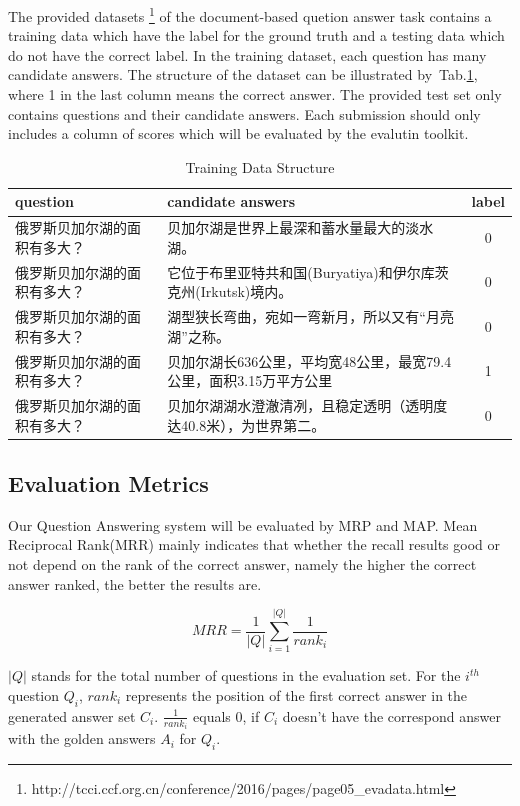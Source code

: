 \documentclass{llncs}
\begin{document}
The provided datasets \footnote{ http://tcci.ccf.org.cn/conference/2016/pages/page05\_evadata.html} of the document-based quetion answer task contains a training data which have the label for the ground truth and a testing data which do not have the correct label.  In the training dataset, each question has many candidate answers. The structure of the dataset can be illustrated by~Tab.\ref{tab:table1}, where 1 in the last column means the correct answer. The provided test set  only contains questions and their candidate answers. Each submission should only includes a column of scores which will be evaluated by the evalutin toolkit.  


\begin{table}[!hbp]
\caption{Training Data Structure}
\scriptsize
\label{tab:table1}
\begin{tabular}{|l|l|c|}
 \hline
question & candidate answers & label \\ \hline
俄罗斯贝加尔湖的面积有多大？& 贝加尔湖是世界上最深和蓄水量最大的淡水湖。& 0 \\
\hline
俄罗斯贝加尔湖的面积有多大？& 它位于布里亚特共和国(Buryatiya)和伊尔库茨克州(Irkutsk)境内。&0\\
\hline
俄罗斯贝加尔湖的面积有多大？& 湖型狭长弯曲，宛如一弯新月，所以又有“月亮湖”之称。&0\\
\hline
俄罗斯贝加尔湖的面积有多大？& 贝加尔湖长636公里，平均宽48公里，最宽79.4公里，面积3.15万平方公里& 1\\
\hline
俄罗斯贝加尔湖的面积有多大？& 贝加尔湖湖水澄澈清冽，且稳定透明（透明度达40.8米），为世界第二。&0\\
\hline
\end{tabular}

\end{table}

\subsection{Evaluation Metrics}
Our Question Answering system will be evaluated by MRP and MAP. Mean Reciprocal Rank(MRR) mainly indicates that whether the recall results good or not depend on the rank of the correct answer, namely the higher the correct answer ranked, the better the results are.

\begin{equation}
MRR=\frac{1}{|Q|}\sum_{i=1}^{|Q|}\frac{1}{rank_{i}}
\end{equation}

$|Q|$ stands for the total number of questions in the evaluation set. For the \(i^{th}\) question \(Q_{i}\), \(rank_{i}\) represents the position of the first correct answer in the generated answer set \(C_{i}\).  \(\frac{1}{rank_{i}}\) equals 0, if \(C_{i}\) doesn't have the correspond answer with the golden answers \(A_{i}\) for \(Q_{i}\). 
\end{document}
